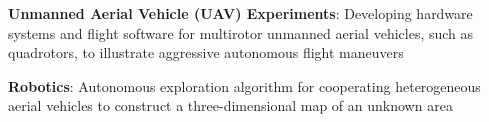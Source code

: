 \documentclass[10pt]{article}
\begin{document}
\begin{list}{}

\item \textbf{Unmanned Aerial Vehicle (UAV) Experiments}: Developing hardware systems and flight software for multirotor unmanned aerial vehicles, such as quadrotors, to illustrate aggressive autonomous flight maneuvers

\item \textbf{Robotics}: Autonomous exploration algorithm for cooperating heterogeneous aerial vehicles to construct a three-dimensional map of an unknown area

\end{list}


\clearpage\newpage
\end{document}
